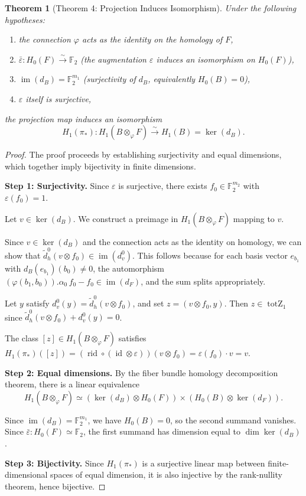 \documentclass[11pt]{article}
\theoremstyle{plain}
\newtheorem*{theorem}{Theorem}
\theoremstyle{definition}
\theoremstyle{remark}
\renewcommand{\ker}{\operatorname{ker}}
\begin{document}
\begin{theorem}[Theorem 4: Projection Induces Isomorphism]
Under the following hypotheses:
\begin{enumerate}
  \item the connection $\varphi$ acts as the identity on the homology of $F$,
  \item $\bar{\varepsilon} : H_0(F) \xrightarrow{\sim} \mathbb{F}_2$ (the augmentation $\varepsilon$ induces an isomorphism on $H_0(F)$),
  \item $\operatorname{im}(d_B) = \mathbb{F}_2^{m_1}$ (surjectivity of $d_B$, equivalently $H_0(B) = 0$),
  \item $\varepsilon$ itself is surjective,
\end{enumerate}
the projection map induces an isomorphism
\[
H_1(\pi_*) : H_1(B \otimes_\varphi F) \xrightarrow{\sim} H_1(B) = \ker(d_B).
\]
\end{theorem}

\begin{proof}
The proof proceeds by establishing surjectivity and equal dimensions, which together imply bijectivity in finite dimensions.

\textbf{Step 1: Surjectivity.} Since $\varepsilon$ is surjective, there exists $f_0 \in \mathbb{F}_2^{m_2}$ with $\varepsilon(f_0) = 1$.

Let $v \in \ker(d_B)$. We construct a preimage in $H_1(B \otimes_\varphi F)$ mapping to $v$.

Since $v \in \ker(d_B)$ and the connection acts as the identity on homology, we can show that $\widetilde{d}_h^0(v \otimes f_0) \in \operatorname{im}(d_v^0)$. This follows because for each basis vector $e_{b_1}$ with $d_B(e_{b_1})(b_0) \neq 0$, the automorphism $(\varphi(b_1,b_0)).\alpha_0\, f_0 - f_0 \in \operatorname{im}(d_F)$, and the sum splits appropriately.

Let $y$ satisfy $d_v^0(y) = \widetilde{d}_h^0(v \otimes f_0)$, and set $z = (v \otimes f_0, y)$. Then $z \in \operatorname{totZ}_1$ since $\widetilde{d}_h^0(v \otimes f_0) + d_v^0(y) = 0$.

The class $[z] \in H_1(B \otimes_\varphi F)$ satisfies $H_1(\pi_*)([z]) = (\operatorname{rid} \circ (\operatorname{id} \otimes \varepsilon))(v \otimes f_0) = \varepsilon(f_0) \cdot v = v$.

\textbf{Step 2: Equal dimensions.} By the fiber bundle homology decomposition theorem, there is a linear equivalence
\[
H_1(B \otimes_\varphi F) \simeq (\ker(d_B) \otimes H_0(F)) \times (H_0(B) \otimes \ker(d_F)).
\]

Since $\operatorname{im}(d_B) = \mathbb{F}_2^{m_1}$, we have $H_0(B) = 0$, so the second summand vanishes. Since $\bar{\varepsilon} : H_0(F) \simeq \mathbb{F}_2$, the first summand has dimension equal to $\dim \ker(d_B)$.

\textbf{Step 3: Bijectivity.} Since $H_1(\pi_*)$ is a surjective linear map between finite-dimensional spaces of equal dimension, it is also injective by the rank-nullity theorem, hence bijective.
\end{proof}
\end{document}
